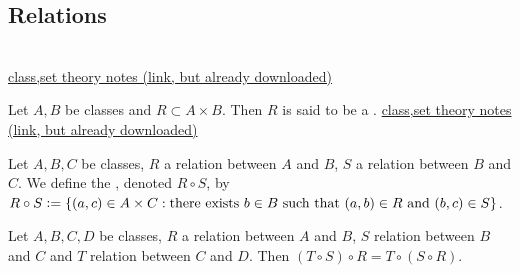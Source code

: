 \documentclass{book}
\begin{document}
	
	
	
	
	
	
	
	
	
	
	
	
	
	
	
	
	
	
	
	
	
	
	
	
	
	
	
	
	
	
	
	
	
	
	
	
	
	\subsection{Relations}
	
	 \\
	 \href{https://arxiv.org/abs/2006.01613}{class,set theory notes (link, but already downloaded)}
	
	\begin{defn}
		Let $A, B$ be classes and $R \subset A \times B$. Then $R$ is said to be a . 
		 \href{https://arxiv.org/abs/2006.01613}{class,set theory notes (link, but already downloaded)}
	\end{defn}
	
	\begin{defn}
		Let $A,B,C$ be classes, $R$ a relation between $A$ and $B$, $S$ a relation between $B$ and $C$. We define the , denoted $R \circ S$, by $R \circ S \vcentcolon= \{(a,c) \in A \times C: \text{there exists $b \in B$ such that $(a,b) \in R$ and $(b,c) \in S$}\}$.
	\end{defn}
	
	\begin{ex}
	\end{ex}
	
	\begin{ex}
		Let $A,B, C, D$ be classes, $R$ a relation between $A$ and $B$, $S$ relation between $B$ and $C$ and $T$ relation between $C$ and $D$. Then $(T \circ S) \circ R = T \circ (S \circ R)$.
	\end{ex}
	
\end{document}
